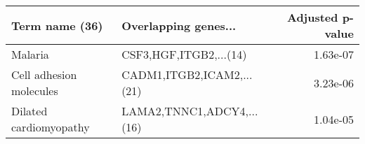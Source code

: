 \begin{tabular}{llr}
\toprule
         Term name (36) &      Overlapping genes... &  Adjusted p-value \\
\midrule
                Malaria &    CSF3,HGF,ITGB2,...(14) &          1.63e-07 \\
Cell adhesion molecules & CADM1,ITGB2,ICAM2,...(21) &          3.23e-06 \\
 Dilated cardiomyopathy & LAMA2,TNNC1,ADCY4,...(16) &          1.04e-05 \\
\bottomrule
\end{tabular}
